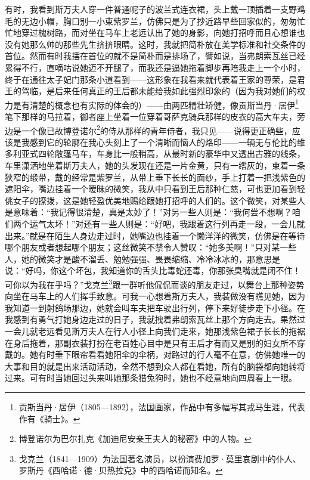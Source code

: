 \par 有时，我看到斯万夫人穿一件普通呢子的波兰式连衣裙，头上戴一顶插着一支野鸡毛的无边小帽，胸口别一小束紫罗兰，仿佛只是为了抄近路早些回家似的，匆匆忙忙地穿过槐树路，而对坐在马车上老远认出了她的身影，向她打招呼而且心想谁也没有她那么帅的那些先生挤挤眼睛。这时，我就把简朴放在美学标准和社交条件的首位。然而有时我摆在首位的就不是简朴而是排场了，譬如说，当弗朗索瓦丝已经累得不行，直嘀咕说她迈不开腿了，而我还是逼她拖着脚步再陪我走上一个小时，终于在通往太子妃门那条小道看到——这形象在我看来就代表着王家的尊荣，是君王的驾临，是后来任何真正的王后都未能给我如此强烈印象的（因为我对她们的权力是有清楚的概念也有实际的体会的）——由两匹精壮矫健，像贡斯当丹·居伊\footnote{贡斯当丹·居伊（1805—1892），法国画家，作品中有多幅写其戎马生涯，代表作有《骑士》。}笔下那样的马拉着，御者座上坐着一位穿着哥萨克骑兵那样的皮衣的高大车夫，旁边是一个像已故博登诺尔\footnote{博登诺尔为巴尔扎克《加迪尼安亲王夫人的秘密》中的人物。}的侍从那样的青年侍者，我只见——说得更正确些，应该是我感到它的轮廓在我心头刻上了一个清晰而恼人的烙印——一辆无与伦比的维多利亚式四轮敞篷马车，车身比一般稍高，从最时新的豪华中又透出古雅的线条，车里潇洒地坐着斯万夫人，她的头发现在还是一片金黄，只有一绺灰的，束着一条狭窄的缎带，戴的经常是紫罗兰，从带上垂下长长的面纱，手上打着一把浅紫色的遮阳伞，嘴边挂着一个暧昧的微笑，我从中只看到王后那种仁慈，可也更加看到轻佻女子的撩拨，这是她轻盈优美地赐给跟她打招呼的人们的。这个微笑，对某些人是意味着：“我记得很清楚，真是太妙了！”对另一些人则是：“我何尝不想啊？咱们两个运气太坏！”对还有一些人则是：“好吧，我跟着这行列再走一段，一会儿就出来。”就是在陌生人身边走过时，她嘴边也挂着一个懒洋洋的微笑，仿佛是在等待哪个朋友或者想起哪个朋友；这丝微笑不禁令人赞叹：“她多美啊！”只对某一些人，她的微笑才是酸不溜丢、勉勉强强、畏畏缩缩、冷冷冰冰的，那意思是说：“好吗，你这个坏包，我知道你的舌头比毒蛇还毒，你那张臭嘴就是闭不住！可你以为我在乎吗？”戈克兰\footnote{戈克兰（1841—1909）为法国著名演员，以扮演费加罗·莫里哀剧中的仆人、罗斯丹《西哈诺·德·贝热拉克》中的西哈诺而知名。}跟一群听他侃侃而谈的朋友走过，以舞台上那种姿势向坐在马车上的人们挥手致意。可我一心想着斯万夫人，我装做没有瞧见她，因为我知道一到射鸽场那边，她就会叫车夫把车驶出行列，停下来好徒步走下小径。在我感到有勇气打她身边走过的日子，我就拽着弗朗索瓦丝上那个方向走去。果然过一会儿就老远看见斯万夫人在行人小径上向我们走来，她那浅紫色裙子长长的拖裾在身后拖着，那副衣装打扮在老百姓心目中是只有王后才有而又是别的妇女所不穿戴的。她有时垂下眼帘看看她阳伞的伞柄，对路过的行人毫不在意，仿佛她唯一的大事和目的就是出来活动活动，全然不想到众人都在看她，所有的脑袋都向她转将过来。可有时当她回过头来叫她那条猎兔狗时，她也不经意地向四周看上一眼。
